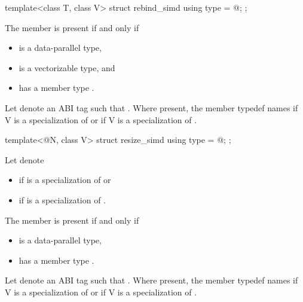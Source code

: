 \begin{itemdecl}
template<class T, class V> struct rebind_simd { using type = @\seebelow@; };
\end{itemdecl}

\begin{itemdescr}
  \pnum
  The member  is present if and only if
  \begin{itemize}
    \item {} is a data-parallel type,
    \item {} is a vectorizable type, and
    \item {} has a member type .
  \end{itemize}

  \pnum
  Let  denote an ABI tag such that .
  Where present, the member typedef  names  if \tcode V is a specialization of  or
   if \tcode V is a specialization of
  .
\end{itemdescr}

\begin{itemdecl}
template<@\simdsizetype@ N, class V> struct resize_simd { using type = @\seebelow@; };
\end{itemdecl}

\begin{itemdescr}
  \pnum Let  denote
  \begin{itemize}
    \item {} if  is a specialization of
       or
    \item {} if  is a
      specialization of .
  \end{itemize}

  \pnum
  The member  is present if and only if
  \begin{itemize}
    \item {} is a data-parallel type,
    \item {} has a member type .
  \end{itemize}

  \pnum
  Let  denote an ABI tag such that .
  Where present, the member typedef  names  if \tcode V is a specialization of  or
   if \tcode V is a specialization of
  .
\end{itemdescr}

